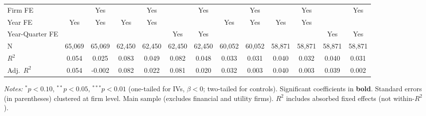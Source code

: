 \documentclass[11pt,a4paper]{article}
\begin{document}
\begin{table}[htbp]
\begin{tabular}{lcccccccccccc}
Firm FE &  & Yes &  & Yes &  & Yes &  & Yes &  & Yes &  & Yes \\
Year FE & Yes & Yes & Yes & Yes &  &  & Yes & Yes & Yes & Yes &  &  \\
Year-Quarter FE &  &  &  &  & Yes & Yes &  &  &  &  & Yes & Yes \\
\midrule
N & 65,069 & 65,069 & 62,450 & 62,450 & 62,450 & 62,450 & 60,052 & 60,052 & 58,871 & 58,871 & 58,871 & 58,871 \\
$R^2$ & 0.054 & 0.025 & 0.083 & 0.049 & 0.082 & 0.048 & 0.033 & 0.031 & 0.040 & 0.032 & 0.040 & 0.031 \\
Adj.~$R^2$ & 0.054 & -0.002 & 0.082 & 0.022 & 0.081 & 0.020 & 0.032 & 0.003 & 0.040 & 0.003 & 0.039 & 0.002 \\
\bottomrule
\end{tabular}
\begin{minipage}{\linewidth}
\vspace{2pt}\scriptsize
\textit{Notes:} $^{*}p<0.10$, $^{**}p<0.05$, $^{***}p<0.01$ (one-tailed for IVs, $\beta < 0$; two-tailed for controls).
 Significant coefficients in \textbf{bold}.
 Standard errors (in parentheses) clustered at firm level.
 Main sample (excludes financial and utility firms).
 $R^2$ includes absorbed fixed effects (not within-$R^2$).
\end{minipage}
\end{table}
\clearpage
\end{document}
